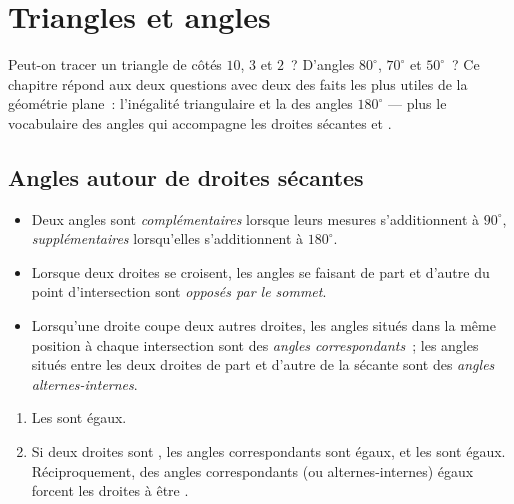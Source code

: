 \chapter{Triangles et angles}\label{ch:g7:triangles}

Peut-on tracer un triangle de côtés $10$, $3$ et $2$~? D'angles
$80^\circ$, $70^\circ$ et $50^\circ$~? Ce chapitre répond aux deux
questions avec deux des faits les plus utiles de la géométrie plane~:
l'inégalité triangulaire et la  des angles $180^\circ$ --- plus
le vocabulaire des angles qui accompagne les droites sécantes et
.

\section{Angles autour de droites sécantes}

\begin{definition}\label{def:g7:triangles:pairs}
\begin{itemize}
  \item Deux angles sont \emph{complémentaires} lorsque leurs mesures
        s'additionnent à $90^\circ$, \emph{supplémentaires} lorsqu'elles
        s'additionnent à $180^\circ$.
  \item Lorsque deux droites se croisent, les angles se faisant 
        de part et d'autre du point d'intersection sont
        \emph{opposés par le
        sommet}.
  \item Lorsqu'une droite coupe deux autres droites, les angles
        situés dans la même position à chaque intersection sont des
        \emph{angles correspondants}~; les angles situés entre les
        deux droites de part et d'autre de la sécante sont des
        \emph{angles alternes-internes}.
\end{itemize}
\end{definition}

\begin{theorem}\label{thm:g7:triangles:equalities}
\begin{enumerate}
  \item Les  sont égaux.
  \item Si deux droites sont , les angles correspondants
        sont égaux, et les  sont égaux.
        Réciproquement, des angles correspondants (ou
        alternes-internes) égaux forcent les droites à être
        .
\end{enumerate}
\end{theorem}

